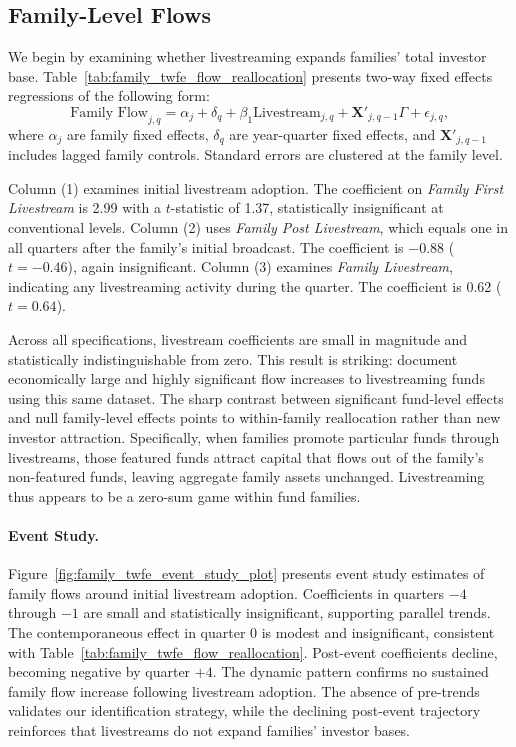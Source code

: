 \documentclass[12pt]{article}
\begin{document}
\subsection{Family-Level Flows}\label{subsec:family_flows}

We begin by examining whether livestreaming expands families' total investor base. Table~\ref{tab:family_twfe_flow_reallocation} presents two-way fixed effects regressions of the following form:
\begin{equation}
    \label{eq:family_flow_twfe}
    \text{Family Flow}_{j,q} = \alpha_j + \delta_q + \beta_1 \text{Livestream}_{j,q} + \mathbf{X}'_{j,q-1} \Gamma + \epsilon_{j,q},
\end{equation}
where $\alpha_j$ are family fixed effects, $\delta_q$ are year-quarter fixed effects, and $\mathbf{X}'_{j,q-1}$ includes lagged family controls. Standard errors are clustered at the family level.

Column (1) examines initial livestream adoption. The coefficient on \textit{Family First Livestre\-am} is 2.99 with a $t$-statistic of 1.37, statistically insignificant at conventional levels. Column (2) uses \textit{Family Post Livestream}, which equals one in all quarters after the family's initial broadcast. The coefficient is $-0.88$ ($t = -0.46$), again insignificant. Column (3) examines \textit{Family Livestream}, indicating any livestreaming activity during the quarter. The coefficient is 0.62 ($t = 0.64$).

Across all specifications, livestream coefficients are small in magnitude and statistically indistinguishable from zero. This result is striking: \citet{dehaan2025social} document economically large and highly significant flow increases to livestreaming funds using this same dataset. The sharp contrast between significant fund-level effects and null family-level effects points to within-family reallocation rather than new investor attraction. Specifically, when families promote particular funds through livestreams, those featured funds attract capital that flows out of the family's non-featured funds, leaving aggregate family assets unchanged. Livestreaming thus appears to be a zero-sum game within fund families.

\paragraph{Event Study.} Figure~\ref{fig:family_twfe_event_study_plot} presents event study estimates of family flows around initial livestream adoption. Coefficients in quarters $-4$ through $-1$ are small and statistically insignificant, supporting parallel trends. The contemporaneous effect in quarter 0 is modest and insignificant, consistent with Table~\ref{tab:family_twfe_flow_reallocation}. Post-event coefficients decline, becoming negative by quarter $+4$. The dynamic pattern confirms no sustained family flow increase following livestream adoption. The absence of pre-trends validates our identification strategy, while the declining post-event trajectory reinforces that livestreams do not expand families' investor bases.
\end{document}

